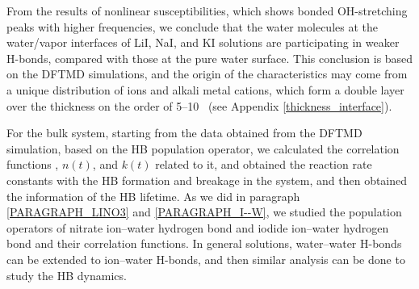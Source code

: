 From the results of nonlinear susceptibilities, which shows bonded OH-stretching peaks with higher frequencies, 
we conclude that the water molecules at the water/vapor interfaces of LiI, NaI, and KI solutions are participating 
in weaker H-bonds, compared with those at the pure water surface. 
This conclusion is based on the DFTMD simulations, and %
the origin of the characteristics may come from a unique distribution of \I ions and alkali metal cations, 
which form a double layer \cite{Shultz2010} over the thickness on the order of 5--10 \A\ (see Appendix \ref{thickness_interface}).

For the bulk system, starting from the data obtained from the DFTMD simulation, based on the HB population operator, 
we calculated the correlation functions \CHB, $n(t)$, and $k(t)$ related to it, and obtained the reaction rate constants with the HB formation and breakage in the system, 
and then obtained the information of the HB lifetime. 
As we did in paragraph \ref{PARAGRAPH_LINO3} and \ref{PARAGRAPH_I--W}, we studied the population operators of nitrate ion--water hydrogen bond 
and iodide ion--water hydrogen bond and their correlation functions. In general solutions, water--water H-bonds can be extended to ion--water H-bonds, 
and then similar analysis can be done to study the HB dynamics.

